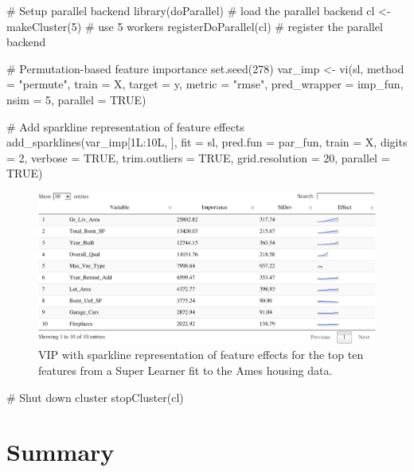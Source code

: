 \begin{Schunk}
\begin{Sinput}
# Setup parallel backend
library(doParallel) # load the parallel backend
cl <- makeCluster(5) # use 5 workers
registerDoParallel(cl) # register the parallel backend

# Permutation-based feature importance
set.seed(278)
var_imp <- vi(sl, method = "permute", train = X, target = y, metric = "rmse",
              pred_wrapper = imp_fun, nsim = 5, parallel = TRUE)

# Add sparkline representation of feature effects
add_sparklines(var_imp[1L:10L, ], fit = sl, pred.fun = par_fun, train = X,
               digits = 2, verbose = TRUE, trim.outliers = TRUE,
               grid.resolution = 20, parallel = TRUE)
\end{Sinput}
\begin{figure}[!htb]

{\centering \includegraphics[width=1\linewidth]{greenwell-boehmke_files/figure-latex/ames-sparklines-1} 

}

\caption[VIP with sparkline representation of feature effects for the top ten features from a Super Learner fit to the Ames housing data]{VIP with sparkline representation of feature effects for the top ten features from a Super Learner fit to the Ames housing data.}\label{fig:ames-sparklines}
\end{figure}
\begin{Sinput}
# Shut down cluster
stopCluster(cl)
\end{Sinput}
\end{Schunk}

\section{Summary}

